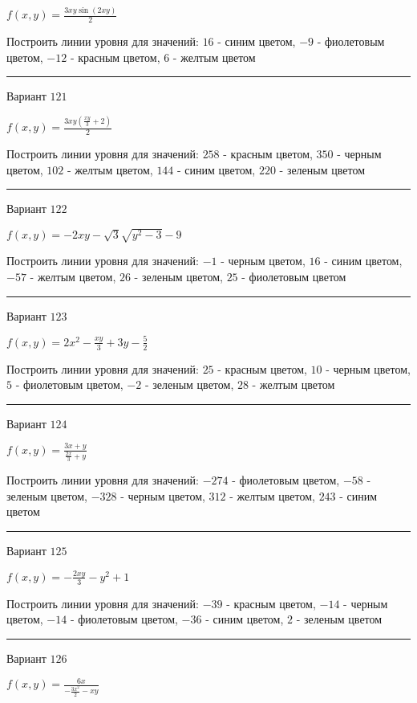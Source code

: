 \documentclass[11pt]{report}
\begin{document}
$f(x, y) = \frac{3 x y \sin{\left(2 x y \right)}}{2}$

Построить линии уровня для значений: $16$ - синим цветом, $-9$ - фиолетовым цветом, $-12$ - красным цветом, $6$ - желтым цветом
\begin{center}
\noindent\rule{8cm}{0.4pt}
\end{center}
Вариант $121$


$f(x, y) = \frac{3 x y \left(\frac{x y}{3} + 2\right)}{2}$

Построить линии уровня для значений: $258$ - красным цветом, $350$ - черным цветом, $102$ - желтым цветом, $144$ - синим цветом, $220$ - зеленым цветом
\begin{center}
\noindent\rule{8cm}{0.4pt}
\end{center}
Вариант $122$


$f(x, y) = - 2 x y - \sqrt{3} \sqrt{y^{2} - 3} - 9$

Построить линии уровня для значений: $-1$ - черным цветом, $16$ - синим цветом, $-57$ - желтым цветом, $26$ - зеленым цветом, $25$ - фиолетовым цветом
\begin{center}
\noindent\rule{8cm}{0.4pt}
\end{center}
Вариант $123$


$f(x, y) = 2 x^{2} - \frac{x y}{3} + 3 y - \frac{5}{2}$

Построить линии уровня для значений: $25$ - красным цветом, $10$ - черным цветом, $5$ - фиолетовым цветом, $-2$ - зеленым цветом, $28$ - желтым цветом
\begin{center}
\noindent\rule{8cm}{0.4pt}
\end{center}
Вариант $124$


$f(x, y) = \frac{3 x + y}{\frac{2 x}{3} + y}$

Построить линии уровня для значений: $-274$ - фиолетовым цветом, $-58$ - зеленым цветом, $-328$ - черным цветом, $312$ - желтым цветом, $243$ - синим цветом
\begin{center}
\noindent\rule{8cm}{0.4pt}
\end{center}
Вариант $125$


$f(x, y) = - \frac{2 x y}{3} - y^{2} + 1$

Построить линии уровня для значений: $-39$ - красным цветом, $-14$ - черным цветом, $-14$ - фиолетовым цветом, $-36$ - синим цветом, $2$ - зеленым цветом
\begin{center}
\noindent\rule{8cm}{0.4pt}
\end{center}
Вариант $126$


$f(x, y) = \frac{6 x}{- \frac{3 x^{2}}{2} - x y}$
\end{document}

